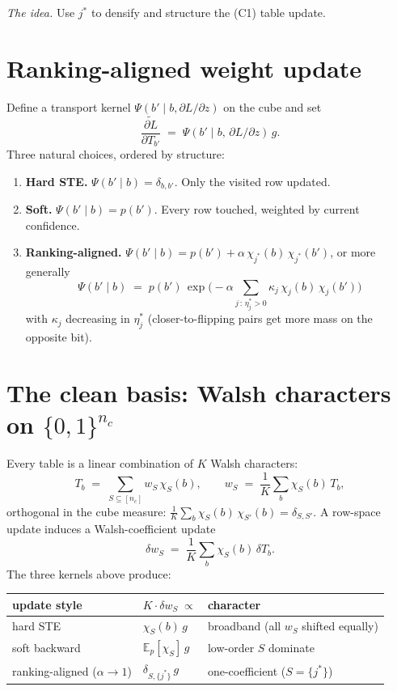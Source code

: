 \documentclass[11pt]{article}
\newcommand{\E}{\mathbb{E}}
\begin{document}
\emph{The idea.} Use $j^*$ to densify and structure the (C1) table update.

\section{Ranking-aligned weight update}
\label{sec:proposal}

Define a transport kernel $\Psi(b' \mid b, \partial L / \partial z)$ on the cube and set
\[
\widetilde{\frac{\partial L}{\partial T_{b'}}} \;=\; \Psi(b' \mid b,\, \partial L / \partial z)\, g.
\]
Three natural choices, ordered by structure:
\begin{enumerate}
\setlength{\itemsep}{2pt}
    \item \textbf{Hard STE.} $\Psi(b' \mid b) = \delta_{b, b'}$. Only the visited row updated.
    \item \textbf{Soft.} $\Psi(b' \mid b) = p(b')$. Every row touched, weighted by current confidence.
    \item \textbf{Ranking-aligned.} $\Psi(b' \mid b) = p(b') + \alpha\, \chi_{j^*}(b)\, \chi_{j^*}(b')$, or more generally
    \[
    \Psi(b' \mid b) \;=\; p(b')\, \exp\!\Big({-}\alpha \sum_{j\, :\, \eta^*_j > 0} \kappa_j\, \chi_j(b)\, \chi_j(b')\Big)
    \]
    with $\kappa_j$ decreasing in $\eta^*_j$ (closer-to-flipping pairs get more mass on the opposite bit).
\end{enumerate}

\section{The clean basis: Walsh characters on $\{0,1\}^{n_c}$}
\label{sec:walsh}

Every table is a linear combination of $K$ Walsh characters:
\[
T_b \;=\; \sum_{S \subseteq [n_c]} w_S\, \chi_S(b), \qquad
w_S \;=\; \frac{1}{K} \sum_b \chi_S(b)\, T_b,
\]
orthogonal in the cube measure: $\tfrac{1}{K}\sum_b \chi_S(b)\, \chi_{S'}(b) = \delta_{S, S'}$. A row-space update induces a Walsh-coefficient update
\[
\delta w_S \;=\; \frac{1}{K}\sum_b \chi_S(b)\, \delta T_b.
\]
The three kernels above produce:

\begin{center}
\renewcommand{\arraystretch}{1.2}
\begin{tabular}{lll}
\toprule
update style & $K \cdot \delta w_S \;\propto$ & character \\
\midrule
hard STE                  & $\chi_S(b)\, g$                       & broadband (all $w_S$ shifted equally) \\
soft backward             & $\E_p[\chi_S]\, g$                    & low-order $S$ dominate \\
ranking-aligned ($\alpha \to 1$)  & $\delta_{S,\{j^*\}}\, g$              & one-coefficient ($S = \{j^*\}$) \\
\bottomrule
\end{tabular}
\end{center}
\end{document}
